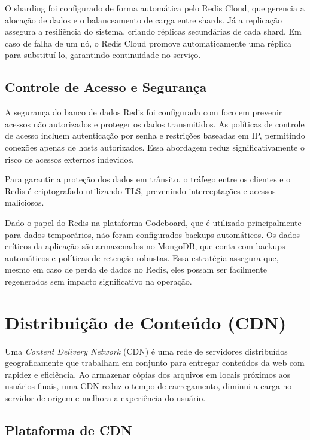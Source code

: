 O sharding foi configurado de forma automática pelo Redis Cloud, que gerencia a alocação de dados e o balanceamento de carga entre shards. Já a replicação assegura a resiliência do sistema, criando réplicas secundárias de cada shard. Em caso de falha de um nó, o Redis Cloud promove automaticamente uma réplica para substituí-lo, garantindo continuidade no serviço.

\subsection{Controle de Acesso e Segurança}

A segurança do banco de dados Redis foi configurada com foco em prevenir acessos não autorizados e proteger os dados transmitidos. As políticas de controle de acesso incluem autenticação por senha e restrições baseadas em IP, permitindo conexões apenas de hosts autorizados. Essa abordagem reduz significativamente o risco de acessos externos indevidos.

Para garantir a proteção dos dados em trânsito, o tráfego entre os clientes e o Redis é criptografado utilizando TLS, prevenindo interceptações e acessos maliciosos.

Dado o papel do Redis na plataforma Codeboard, que é utilizado principalmente para dados temporários, não foram configurados backups automáticos. Os dados críticos da aplicação são armazenados no MongoDB, que conta com backups automáticos e políticas de retenção robustas. Essa estratégia assegura que, mesmo em caso de perda de dados no Redis, eles possam ser facilmente regenerados sem impacto significativo na operação.


\section{Distribuição de Conteúdo (CDN)}

Uma \emph{Content Delivery Network} (CDN) é uma rede de servidores distribuídos geograficamente que trabalham em conjunto para entregar conteúdos da web com rapidez e eficiência. Ao armazenar cópias dos arquivos em locais próximos aos usuários finais, uma CDN reduz o tempo de carregamento, diminui a carga no servidor de origem e melhora a experiência do usuário.

\subsection{Plataforma de CDN}

